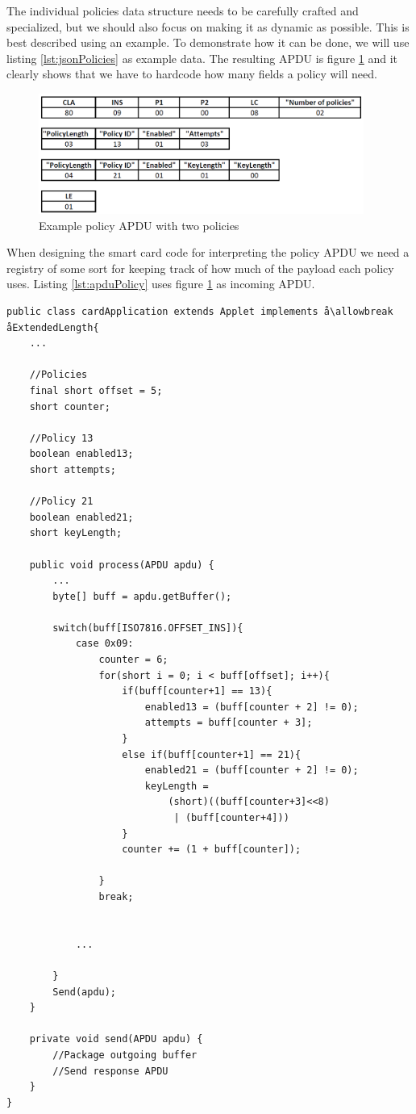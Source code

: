 The individual policies data structure needs to be carefully crafted and specialized, but we should also focus on making it as dynamic as possible. This is best described using an example. To demonstrate how it can be done, we will use listing \ref{lst:jsonPolicies} as example data. The resulting APDU is figure \ref{fig:policyAPDU} and it clearly shows that we have to hardcode how many fields a policy will need.

\begin{figure}[h!]
  \caption{Example policy APDU with two policies}
  \label{fig:policyAPDU}
  \centering
    \includegraphics[width=0.95\textwidth]{images/policyAPDU.png}
\end{figure}

When designing the smart card code for interpreting the policy APDU we need a registry of some sort for keeping track of how much of the payload each policy uses. Listing \ref{lst:apduPolicy} uses figure \ref{fig:policyAPDU} as incoming APDU.

\begin{lstlisting}[caption=Pseudo code for interpreting policy APDU with Java Card., label=lst:apduPolicy,escapechar=å]
public class cardApplication extends Applet implements å\allowbreak åExtendedLength{
    ...

    //Policies
    final short offset = 5;
    short counter;

    //Policy 13
    boolean enabled13;
    short attempts;

    //Policy 21
    boolean enabled21;
    short keyLength;

    public void process(APDU apdu) {
    	...
        byte[] buff = apdu.getBuffer();

    	switch(buff[ISO7816.OFFSET_INS]){
            case 0x09:
                counter = 6;
                for(short i = 0; i < buff[offset]; i++){
                    if(buff[counter+1] == 13){
                        enabled13 = (buff[counter + 2] != 0);
                        attempts = buff[counter + 3];
                    }
                    else if(buff[counter+1] == 21){
                        enabled21 = (buff[counter + 2] != 0);
                        keyLength =
                            (short)((buff[counter+3]<<8)
                             | (buff[counter+4]))
                    }
                    counter += (1 + buff[counter]);

                }
                break;


            ...

    	}
    	Send(apdu);
    }

    private void send(APDU apdu) {
    	//Package outgoing buffer
    	//Send response APDU
    }
}
\end{lstlisting}

